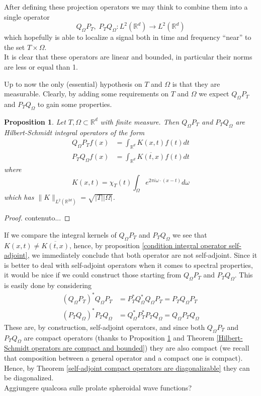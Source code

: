 \documentclass[corpo=11pt, stile=classica, tipotesi=custom,
greek, evenboxes, english]{toptesi}
\numberwithin{equation}{chapter}
\newtheorem{prop}[teo]{Proposition}
\theoremstyle{remark}
\newcommand{\R}{\mathbb{R}} %
\begin{document}
After defining these projection operators we may think to combine them into a single operator
\begin{equation*}\label{composition of projections}
	Q_{\Omega} P_T, \; P_T Q_{\Omega} : L^2(\R^d) \rightarrow L^2(\R^d)
\end{equation*}
which hopefully is able to localize a signal both in time and frequency ``near'' to the set $T \times \Omega$.\\
It is clear that these operators are linear and bounded, in particular their norms are less or equal than 1.

Up to now the only (essential) hypothesis on $T$ and $\Omega$ is that they are measurable. Clearly, by adding some requirements on $T$ and $\Omega$ we expect $Q_{\Omega} P_T$ and $P_T Q_{\Omega}$ to gain some properties.
\begin{prop}\label{projection operators are Hilbert-Schmidt}
	Let $T,\Omega \subset \R^d$ with finite measure. Then $Q_{\Omega} P_T$ and $P_T Q_{\Omega}$ are Hilbert-Schmidt integral operators of the form
	\begin{align}
		Q_{\Omega} P_T f(x) &= \int_{\R^d} K(x,t) f(t) dt \\
		P_T Q_{\Omega} f(x) &= \int_{\R^d} \overline{K(t,x)}f(t)dt
	\end{align}
	where
	\begin{equation}\label{integral kernel projection operators}
		K(x,t) = \chi_T(t) \int_{\Omega} e^{2 \pi i \omega \cdot (x-t)}d\omega
	\end{equation}
	which has $\| K \|_{L^2(\R^{2d})} = \sqrt{|T||\Omega|}$.
\end{prop}
\begin{proof}
	contenuto...
\end{proof}
If we compare the integral kernels of $Q_{\Omega} P_T$ and $P_T Q_{\Omega}$ we see that $K(x,t) \neq \overline{K(t,x)}$, hence, by proposition \ref{condition integral operator self-adjoint}, we immediately conclude that both operator are not self-adjoint. {\color{red} Since it is better to deal with self-adjoint operators when it comes to spectral properties, it would be nice if we could construct those starting from $Q_{\Omega} P_T$ and $P_T Q_{\Omega}$.} This is easily done by considering
\begin{align}
	(Q_{\Omega} P_T)^* Q_{\Omega} P_T &= P_T^* Q_{\Omega}^* Q_{\Omega} P_T= P_T Q_{\Omega} P_T\\
	(P_T Q_{\Omega})^* P_T Q_{\Omega} &= Q_{\Omega}^* P_T^* P_T Q_{\Omega} = Q_{\Omega} P_T Q_{\Omega}
\end{align} 
These are, by construction, self-adjoint operators, and since both $Q_{\Omega} P_T$ and $P_T Q_{\Omega}$ are compact operators (thanks to Proposition \ref{projection operators are Hilbert-Schmidt} and Theorem \ref{Hilbert-Schmidt operators are compact and bounded}) they are also compact (we recall that composition between a general operator and a compact one is compact). Hence, by Theorem \ref{self-adjoint compact operators are diagonalizable} they can be diagonalized.\\
{\color{red} Aggiungere qualcosa sulle prolate spheroidal wave functions?}
\end{document}
